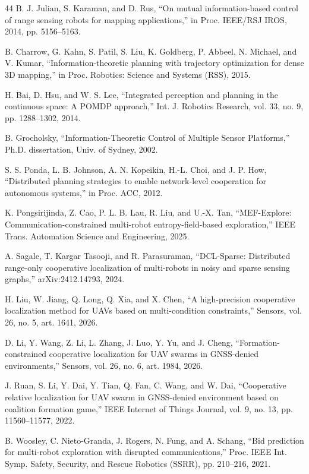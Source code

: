 \documentclass[journal]{IEEEtran}
\begin{document}
\begin{thebibliography}{44}
 B. J. Julian, S. Karaman, and D. Rus, ``On mutual information-based control of range sensing robots for mapping applications,'' in Proc. IEEE/RSJ IROS, 2014, pp. 5156--5163.

 B. Charrow, G. Kahn, S. Patil, S. Liu, K. Goldberg, P. Abbeel, N. Michael, and V. Kumar, ``Information-theoretic planning with trajectory optimization for dense 3D mapping,'' in Proc. Robotics: Science and Systems (RSS), 2015.

 H. Bai, D. Hsu, and W. S. Lee, ``Integrated perception and planning in the continuous space: A POMDP approach,'' Int. J. Robotics Research, vol. 33, no. 9, pp. 1288--1302, 2014.

 B. Grocholsky, ``Information-Theoretic Control of Multiple Sensor Platforms,'' Ph.D. dissertation, Univ. of Sydney, 2002.

 S. S. Ponda, L. B. Johnson, A. N. Kopeikin, H.-L. Choi, and J. P. How, ``Distributed planning strategies to enable network-level cooperation for autonomous systems,'' in Proc. ACC, 2012.

 K. Pongsirijinda, Z. Cao, P. L. B. Lau, R. Liu, and U.-X. Tan, ``MEF-Explore: Communication-constrained multi-robot entropy-field-based exploration,'' IEEE Trans. Automation Science and Engineering, 2025.

 A. Sagale, T. Kargar Tasooji, and R. Parasuraman, ``DCL-Sparse: Distributed range-only cooperative localization of multi-robots in noisy and sparse sensing graphs,'' arXiv:2412.14793, 2024.

 H. Liu, W. Jiang, Q. Long, Q. Xia, and X. Chen, ``A high-precision cooperative localization method for UAVs based on multi-condition constraints,'' Sensors, vol. 26, no. 5, art. 1641, 2026.

 D. Li, Y. Wang, Z. Li, L. Zhang, J. Luo, Y. Yu, and J. Cheng, ``Formation-constrained cooperative localization for UAV swarms in GNSS-denied environments,'' Sensors, vol. 26, no. 6, art. 1984, 2026.

 J. Ruan, S. Li, Y. Dai, Y. Tian, Q. Fan, C. Wang, and W. Dai, ``Cooperative relative localization for UAV swarm in GNSS-denied environment based on coalition formation game,'' IEEE Internet of Things Journal, vol. 9, no. 13, pp. 11560--11577, 2022.

 B. Woosley, C. Nieto-Granda, J. Rogers, N. Fung, and A. Schang, ``Bid prediction for multi-robot exploration with disrupted communications,'' Proc. IEEE Int. Symp. Safety, Security, and Rescue Robotics (SSRR), pp. 210--216, 2021.


\end{thebibliography}
\end{document}

